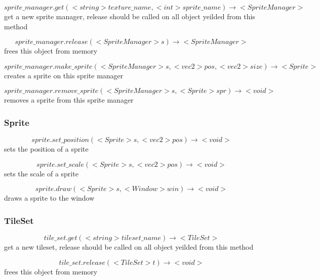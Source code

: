 \documentclass[11pt,fleqn]{book} %
\begin{document}
\begin{equation}
sprite\_manager.get(<string> texture\_name, <int> sprite\_name) \rightarrow <SpriteManager>
\end{equation}
get a new sprite manager, release should be called on all object yeilded from this method

\begin{equation}
sprite\_manager.release(<SpriteManager> s) \rightarrow <SpriteManager>
\end{equation}
frees this object from memory

\begin{equation}
sprite\_manager.make\_sprite(<SpriteManager> s, <vec2> pos, <vec2> size) \rightarrow <Sprite>
\end{equation}
creates a sprite on this sprite manager

\begin{equation}
sprite\_manager.remove\_sprite(<SpriteManager> s, <Sprite> spr) \rightarrow <void>
\end{equation}
removes a sprite from this sprite manager

\subsubsection{Sprite}
\begin{equation}
sprite.set\_position(<Sprite> s, <vec2> pos) \rightarrow <void>
\end{equation}
sets the position of a sprite

\begin{equation}
sprite.set\_scale(<Sprite> s, <vec2> pos) \rightarrow <void>
\end{equation}
sets the scale of a sprite

\begin{equation}
sprite.draw(<Sprite> s, <Window> win) \rightarrow <void>
\end{equation}
draws a sprite to the window

\subsubsection{TileSet}
\begin{equation}
tile\_set.get(<string> tileset\_name) \rightarrow <TileSet>
\end{equation}
get a new tileset, release should be called on all object yeilded from this method

\begin{equation}
tile\_set.release(<TileSet> t) \rightarrow <void>
\end{equation}
frees this object from memory
\end{document}
